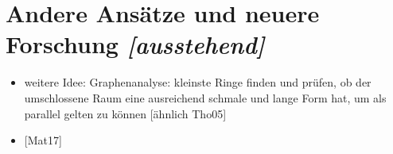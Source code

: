 \documentclass[../main/thesis.tex]{subfiles}
\begin{document}
\section{Andere Ansätze und neuere Forschung \emph{[ausstehend]}}

\begin{itemize}
\item weitere Idee: Graphenanalyse: kleinste Ringe finden und prüfen, ob der umschlossene Raum eine ausreichend schmale und lange Form hat, um als parallel gelten zu können [ähnlich Tho05]
\item {[Mat17]}
\end{itemize}




\end{document}
